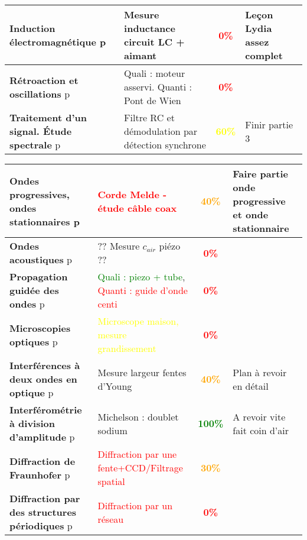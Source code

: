 \begin{changemargin}{-1.5cm}{-0cm}
\begin{center}
\begin{tabularx}{\paperwidth-2cm}{| X | X | c | X |}
  \hline 
  \textbf{Induction électromagnétique} p\pageref{LP_Induction} & Mesure inductance circuit LC + aimant & \textcolor{red}{\textbf{0\%}} & Leçon Lydia assez complet\\
  \hline
  \textbf{Rétroaction et oscillations} p\pageref{LP_RetroactionOscillation} & Quali : moteur asservi. Quanti : Pont de Wien & \textcolor{red}{\textbf{0\%}} & \\
  \hline
  \textbf{Traitement d'un signal. Étude spectrale} p\pageref{LP_TraitementSignal} & Filtre RC et démodulation par détection synchrone & \textcolor{yellow}{\textbf{60\%}} & Finir partie 3\\
  \hline
\end{tabularx}
\end{center}

\begin{center}
\begin{tabularx}{\paperwidth-2cm}{| X | X | c | X |}
\hline
  \textbf{Ondes progressives, ondes stationnaires} p\pageref{LP_OndesProgressives}~& \textcolor{red}{Corde Melde - étude câble coax} & \textcolor{orange}{\textbf{40\%}} & Faire partie onde progressive et onde stationnaire \\
  \hline
  \textbf{Ondes acoustiques} p\pageref{LP_OndeAcoustique}~& ?? Mesure $c_{air}$ piézo ?? & \textcolor{red}{\textbf{0\%}} &  \\
  \hline
  \textbf{Propagation guidée des ondes} p\pageref{LP_PropagationGuidee} & \textcolor{green}{Quali : piezo + tube}, \textcolor{red}{Quanti : guide d'onde centi}& \textcolor{red}{\textbf{0\%}} & \\
  \hline
  \textbf{Microscopies optiques} p\pageref{LP_Microscopie}~& \textcolor{yellow}{Microscope maison, mesure grandissement}~& \textcolor{red}{\textbf{0\%}} &  \\
  \hline
  \textbf{Interférences à deux ondes en optique} p\pageref{LP_InterferencesDeuxOndes}~& Mesure largeur fentes d'Young & \textcolor{orange}{\textbf{40\%}} & Plan à revoir en détail\\
  \hline
  \textbf{Interférométrie à division d'amplitude} p\pageref{LP_DivisionAmplitude} & Michelson : doublet sodium & \textcolor{green}{\textbf{100\%}} & A revoir vite fait coin d'air \\
  \hline
  \textbf{Diffraction de Fraunhofer} p\pageref{LP_DiffractionFraunhofer} & \textcolor{red}{Diffraction par une fente+CCD/Filtrage spatial }& \textcolor{orange}{\textbf{30\%}} &  \\
  \hline
  \textbf{Diffraction par des structures périodiques} p\pageref{LP_DiffractionPeriodique} & \textcolor{red}{Diffraction par un réseau} & \textcolor{red}{\textbf{0\%}} &  \\

\end{tabularx}
\end{center}
\end{changemargin}
